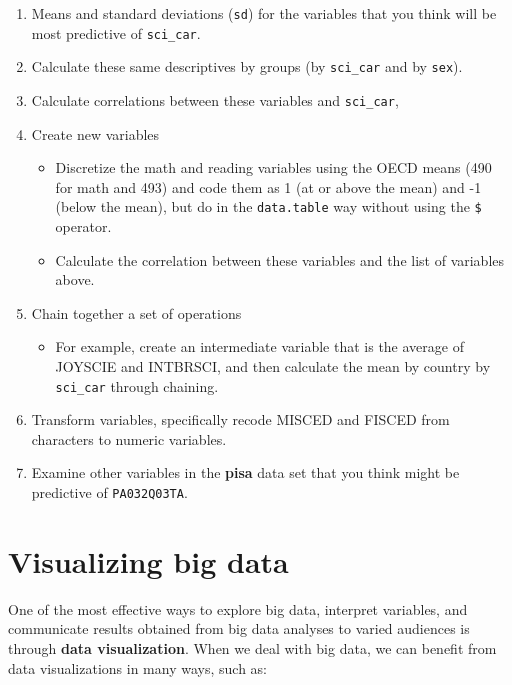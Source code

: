\documentclass[
]{book}
\providecommand{\tightlist}{%
  \setlength{\itemsep}{0pt}\setlength{\parskip}{0pt}}
\begin{document}
\begin{enumerate}
\def\labelenumi{\arabic{enumi}.}
\setcounter{enumi}{2}
\item
  Means and standard deviations (\texttt{sd}) for the variables that you think will be most predictive of \texttt{sci\_car}.
\item
  Calculate these same descriptives by groups (by \texttt{sci\_car} and by \texttt{sex}).
\item
  Calculate correlations between these variables and \texttt{sci\_car},
\item
  Create new variables

  \begin{itemize}
  \tightlist
  \item
    Discretize the math and reading variables using the OECD means (490 for math and 493) and code them as 1 (at or above the mean) and -1 (below the mean), but do in the \texttt{data.table} way without using the \texttt{\$} operator.
  \item
    Calculate the correlation between these variables and the list of variables above.
  \end{itemize}
\item
  Chain together a set of operations

  \begin{itemize}
  \tightlist
  \item
    For example, create an intermediate variable that is the average of JOYSCIE and INTBRSCI, and then calculate the mean by country by \texttt{sci\_car} through chaining.
  \end{itemize}
\item
  Transform variables, specifically recode MISCED and FISCED from characters to numeric variables.
\item
  Examine other variables in the \textbf{pisa} data set that you think might be predictive of \texttt{PA032Q03TA}.
\end{enumerate}

\hypertarget{visualizing-big-data}{%
\chapter{Visualizing big data}\label{visualizing-big-data}}

One of the most effective ways to explore big data, interpret variables, and communicate results obtained from big data analyses to varied audiences is through \textbf{data visualization}. When we deal with big data, we can benefit from data visualizations in many ways, such as:
\end{document}
